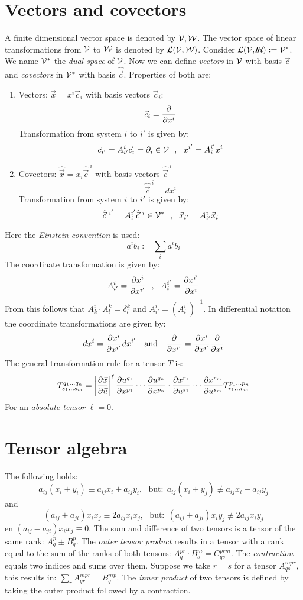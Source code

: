 \documentclass[a4paper,fancyheadings,twoside]{report}
\begin{document}
\section{Vectors and covectors}
A finite dimensional vector space is denoted by $\cal V, W$. The vector
space of linear transformations from $\cal V$ to $\cal W$ is denoted by
$\cal L(V,W)$. Consider ${\cal L(V,}I\hspace{-1mm}R):={\cal V}^*$. We name $\cal V^*$ the
{\it dual space} of $\cal V$. Now we can define {\it vectors} in $\cal V$ with
basis $\vec{c}$ and {\it covectors} in $\cal V^*$ with basis $\hat{\vec{c}}$.
Properties of both are:
\begin{enumerate}
\item Vectors: $\vec{x}=x^i\vec{c}_i$ with basis vectors $\vec{c}_i$:
      \[
      \vec{c}_i=\frac{\partial }{\partial x^i}
      \]
      Transformation from system $i$ to $i'$ is given by:
      \[
      \vec{c}_{i'}=A_{i'}^i\vec{c}_i=\partial_i\in{\cal V}~~,~~x^{i'}=A_i^{i'}x^i
      \]
\item Covectors: $\hat{\vec{x}}=x_i\hat{\vec{c}}^{~i}$ with basis vectors $\hat{\vec{c}}^{~i}$
      \[
      \hat{\vec{c}}^{~i}=dx^i
      \]
      Transformation from system $i$ to $i'$ is given by:
      \[
      \hat{\vec{c}}^{~i'}=A_i^{i'}\hat{\vec{c}}^{~i}\in{\cal V}^*~~,~~\vec{x}_{i'}=A_{i'}^i\vec{x}_i
      \]
\end{enumerate}
Here the {\it Einstein convention} is used:
\[
a^ib_i:=\sum_ia^ib_i
\]
The coordinate transformation is given by:
\[
A_{i'}^i=\frac{\partial x^i}{\partial x^{i'}}~~,~~A_i^{i'}=\frac{\partial x^{i'}}{\partial x^i}
\]
From this follows that $A_k^i\cdot A_l^k=\delta_l^k$ and $A_{i'}^i=(A_i^{i'})^{-1}$.
\npar
In differential notation the coordinate transformations are given by:
\[
dx^i=\frac{\partial x^i}{\partial x^{i'}}dx^{i'}~~~\mbox{and}~~~\frac{\partial }{\partial x^{i'}}=\frac{\partial x^i}{\partial x^{i'}}\frac{\partial }{\partial x^i}
\]
The general transformation rule for a tensor $T$ is:
\[
T_{s_1...s_m}^{q_1...q_n}=\left|\frac{\partial \vec{x}}{\partial \vec{u}}\right|^\ell
\frac{\partial u^{q_1}}{\partial x^{p_1}}\cdots\frac{\partial u^{q_n}}{\partial x^{p_n}}\cdot\frac{\partial x^{r_1}}{\partial u^{s_1}}\cdots\frac{\partial x^{r_m}}{\partial u^{s_m}}T_{r_1...r_m}^{p_1...p_n}
\]
For an {\it absolute tensor} $\ell=0$.

\section{Tensor algebra}
The following holds:
\[
a_{ij}(x_i+y_i)\equiv a_{ij}x_i+a_{ij}y_i,~~~\mbox{but:}~~a_{ij}(x_i+y_j)\not\equiv a_{ij}x_i+a_{ij}y_j
\]
and
\[
(a_{ij}+a_{ji})x_ix_j\equiv2a_{ij}x_ix_j,~~~\mbox{but:}~~(a_{ij}+a_{ji})x_iy_j\not\equiv 2a_{ij}x_iy_j
\]
en $(a_{ij}-a_{ji})x_ix_j\equiv0$.
\npar
The sum and difference of two tensors is a tensor of the same rank:
$A_q^p\pm B_q^p$. The {\it outer tensor product} results in a tensor with a
rank equal to the sum of the ranks of both tensors:
$A_q^{pr}\cdot B_s^m=C_{qs}^{prm}$. The {\it contraction} equals two indices
and sums over them. Suppose we take $r=s$ for a tensor $A_{qs}^{mpr}$, this
results in: $\sum\limits_r A_{qr}^{mpr}=B_q^{mp}$. The
{\it inner product} of two tensors is defined by taking the outer product
followed by a contraction.
\end{document}
